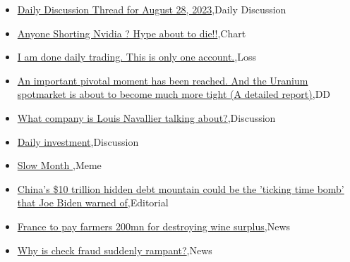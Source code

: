 \documentclass{article}%
\begin{document}
%
\begin{itemize}%
\item%
\href{https://reddit.com/r/wallstreetbets/comments/163hyxh/daily\_discussion\_thread\_for\_august\_28\_2023/}{Daily Discussion Thread for August 28, 2023},Daily Discussion%
\item%
\href{https://reddit.com/r/wallstreetbets/comments/163bppa/anyone\_shorting\_nvidia\_hype\_about\_to\_die/}{Anyone Shorting Nvidia ? Hype about to die!!},Chart%
\item%
\href{https://reddit.com/r/wallstreetbets/comments/163aaji/i\_am\_done\_daily\_trading\_this\_is\_only\_one\_account/}{I am done daily trading. This is only one account.},Loss%
\item%
\href{https://reddit.com/r/Baystreetbets/comments/162o3g2/an\_important\_pivotal\_moment\_has\_been\_reached\_and/}{An important pivotal moment has been reached. And the Uranium spotmarket is about to become much more tight (A detailed report)},DD%
\item%
\href{https://reddit.com/r/StockMarket/comments/162wleh/what\_company\_is\_louis\_navallier\_talking\_about/}{What company is Louis Navallier talking about?},Discussion%
\item%
\href{https://reddit.com/r/StockMarket/comments/162cacg/daily\_investment/}{Daily investment},Discussion%
\item%
\href{https://reddit.com/r/StockMarket/comments/162b7tz/slow\_month/}{Slow Month },Meme%
\item%
\href{https://reddit.com/r/Economics/comments/163cdg5/chinas\_10\_trillion\_hidden\_debt\_mountain\_could\_be/}{China's \$10 trillion hidden debt mountain could be the 'ticking time bomb' that Joe Biden warned of},Editorial%
\item%
\href{https://reddit.com/r/Economics/comments/1638qci/france\_to\_pay\_farmers\_200mn\_for\_destroying\_wine/}{France to pay farmers 200mn for destroying wine surplus},News%
\item%
\href{https://reddit.com/r/Economics/comments/1633xgl/why\_is\_check\_fraud\_suddenly\_rampant/}{Why is check fraud suddenly rampant?},News%
\end{itemize}%
\end{document}
